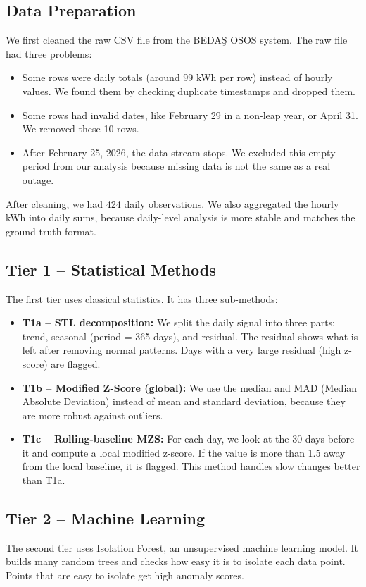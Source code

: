 \documentclass[11pt,a4paper]{article}
\begin{document}
\subsection{Data Preparation}
We first cleaned the raw CSV file from the BEDAŞ OSOS system. The raw file had three problems:
\begin{itemize}
    \item Some rows were daily totals (around 99 kWh per row) instead of hourly values. We found them by checking duplicate timestamps and dropped them.
    \item Some rows had invalid dates, like February 29 in a non-leap year, or April 31. We removed these 10 rows.
    \item After February 25, 2026, the data stream stops. We excluded this empty period from our analysis because missing data is not the same as a real outage.
\end{itemize}
After cleaning, we had 424 daily observations. We also aggregated the hourly kWh into daily sums, because daily-level analysis is more stable and matches the ground truth format.

\subsection{Tier 1 -- Statistical Methods}
The first tier uses classical statistics. It has three sub-methods:
\begin{itemize}
    \item \textbf{T1a -- STL decomposition:} We split the daily signal into three parts: trend, seasonal (period = 365 days), and residual. The residual shows what is left after removing normal patterns. Days with a very large residual (high z-score) are flagged.
    \item \textbf{T1b -- Modified Z-Score (global):} We use the median and MAD (Median Absolute Deviation) instead of mean and standard deviation, because they are more robust against outliers.
    \item \textbf{T1c -- Rolling-baseline MZS:} For each day, we look at the 30 days before it and compute a local modified z-score. If the value is more than 1.5 away from the local baseline, it is flagged. This method handles slow changes better than T1a.
\end{itemize}

\subsection{Tier 2 -- Machine Learning}
The second tier uses Isolation Forest, an unsupervised machine learning model. It builds many random trees and checks how easy it is to isolate each data point. Points that are easy to isolate get high anomaly scores.
\end{document}
